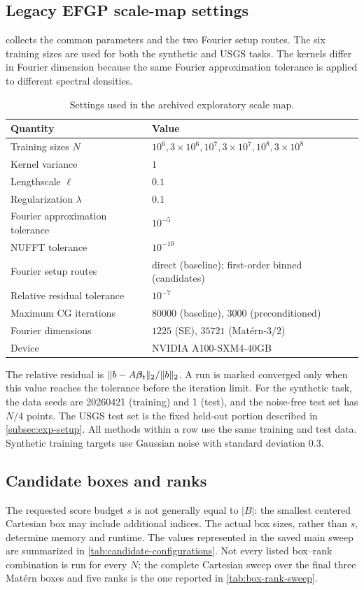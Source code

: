 \subsection{Legacy EFGP scale-map settings}

 collects the common parameters and the
two Fourier setup routes. The six training sizes are used for both the
synthetic and USGS tasks. The kernels differ in Fourier dimension because the
same Fourier approximation tolerance is applied to different spectral
densities.

\begin{table}[H]
\centering
\small
\caption{Settings used in the archived exploratory scale map.}
\label{tab:common-experiment-parameters}
\begin{tabular}{@{}ll@{}}
\toprule
Quantity & Value \tabularnewline
\midrule
Training sizes \(N\) & \(10^6,3\times10^6,10^7,3\times10^7,10^8,3\times10^8\) \tabularnewline
Kernel variance & \(1\) \tabularnewline
Lengthscale \(\ell\) & \(0.1\) \tabularnewline
Regularization \(\lambda\) & \(0.1\) \tabularnewline
Fourier approximation tolerance & \(10^{-5}\) \tabularnewline
NUFFT tolerance & \(10^{-10}\) \tabularnewline
Fourier setup routes & direct (baseline); first-order binned (candidates) \tabularnewline
Relative residual tolerance & \(10^{-7}\) \tabularnewline
Maximum CG iterations & \(80000\) (baseline), \(3000\) (preconditioned) \tabularnewline
Fourier dimensions & \(1225\) (SE), \(35721\) (Mat\'ern-\(3/2\)) \tabularnewline
Device & NVIDIA A100-SXM4-40GB \tabularnewline
\bottomrule
\end{tabular}
\end{table}

The relative residual is \(\|b-A\boldsymbol\beta_t\|_2/\|b\|_2\). A run is marked
converged only when this value reaches the tolerance before the iteration
limit. For the synthetic task, the data seeds are 20260421 (training) and 1
(test), and the noise-free test set has \(N/4\) points. The USGS test set is
the fixed held-out portion described in \cref{subsec:exp-setup}. All methods
within a row use the same training and test data. Synthetic training targets
use Gaussian noise with standard deviation \(0.3\).

\subsection{Candidate boxes and ranks}

The requested score budget \(s\) is not generally equal to \(|B|\): the
smallest centered Cartesian box may include additional indices. The actual box
sizes, rather than \(s\), determine memory and runtime. The values represented
in the saved main sweep are summarized in
\cref{tab:candidate-configurations}. Not every listed box--rank combination is
run for every \(N\); the complete Cartesian sweep over the final three
Mat\'ern boxes and five ranks is the one reported in
\cref{tab:box-rank-sweep}.

